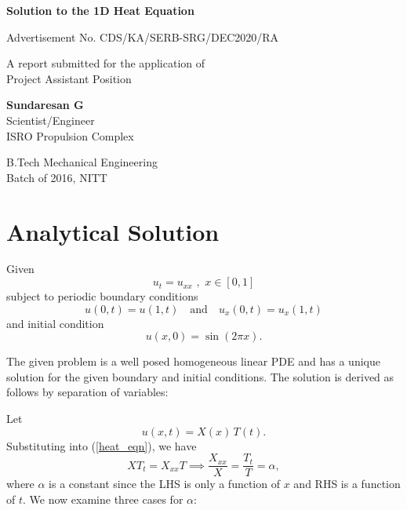 \documentclass[12pt]{article}
\author{Sundaresan G}
\begin{document}
	
	\begin{titlepage}
		\begin{center}
			\vspace*{1cm}
			
			\textbf{\Large{Solution to the 1D Heat Equation}}
			
			\vspace{0.5cm}
			Advertisement No. CDS/KA/SERB-SRG/DEC2020/RA
			
			\vspace{1.5cm}
			
			A report submitted for the application of\\
			Project Assistant Position
			
			
			\vfill
			
			\textbf{\large{Sundaresan G}}\\
			Scientist/Engineer\\
			ISRO Propulsion Complex
			
			\vspace{0.8cm}
			
			B.Tech Mechanical Engineering\\
			Batch of 2016, NITT\\
			
		\end{center}
	\end{titlepage}
	\tableofcontents
	
	\section{Analytical Solution}
	Given 
	\begin{equation} \label{heat_eqn}
	u_t=u_{xx} \,\,,\,\, x\in [0,1] 
	\end{equation}
	subject to periodic boundary conditions 
	\begin{equation*}
	u(0,t)=u(1,t) \quad \text{and} \quad u_x(0,t)=u_x(1,t)    
	\end{equation*}
	and initial condition
	\begin{equation}\label{initial}
	u(x,0)=\sin(2\pi x).    
	\end{equation}
	
	The given problem is a well posed homogeneous linear PDE and has a unique solution for the given boundary and initial conditions. The solution is derived as follows by separation of variables:
	
	Let 
	\begin{equation}
	u(x,t)=X(x)\,T(t).
	\end{equation}
	Substituting into (\ref{heat_eqn}), we have 
	\begin{equation*}
	XT_t=X_{xx}T \implies \frac{X_{xx}}{X}=\frac{T_t}{T}=\alpha,
	\end{equation*}
	where $\alpha$ is a constant since the LHS is only a function of $x$ and RHS is a function of $t$. We now examine three cases for $\alpha$:
	
\end{document}

